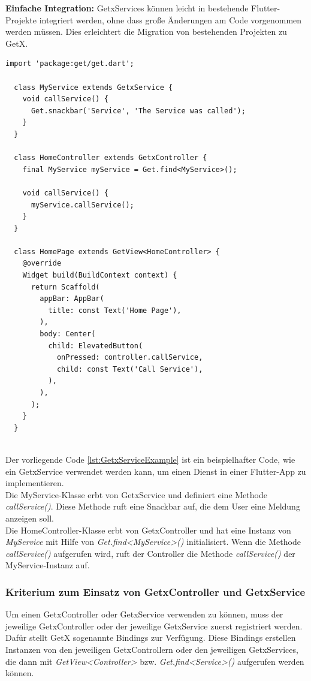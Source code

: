 \textbf{Einfache Integration:}
GetxServices können leicht in bestehende Flutter-Projekte integriert werden, ohne dass große Änderungen am Code vorgenommen werden müssen. Dies erleichtert die Migration von bestehenden Projekten zu GetX.
\\
\begin{lstlisting}[caption=Beispiel zum Einsatz von einem GetxService,label=lst:GetxServiceExample]
  import 'package:get/get.dart';

  class MyService extends GetxService {
    void callService() {
      Get.snackbar('Service', 'The Service was called');
    }
  }

  class HomeController extends GetxController {
    final MyService myService = Get.find<MyService>();
  
    void callService() {
      myService.callService();
    }
  }
  
  class HomePage extends GetView<HomeController> {
    @override
    Widget build(BuildContext context) {
      return Scaffold(
        appBar: AppBar(
          title: const Text('Home Page'),
        ),
        body: Center(
          child: ElevatedButton(
            onPressed: controller.callService,
            child: const Text('Call Service'),
          ),
        ),
      );
    }
  }
  
\end{lstlisting}
Der vorliegende Code \ref{lst:GetxServiceExample} ist ein beispielhafter Code, wie ein GetxService verwendet werden kann, um einen Dienst in einer Flutter-App zu implementieren.
\\
Die MyService-Klasse erbt von GetxService und definiert eine Methode \textit{callService()}. Diese Methode ruft eine Snackbar auf, die dem User eine Meldung anzeigen soll.
\\
Die HomeController-Klasse erbt von GetxController und hat eine Instanz von \textit{MyService} mit Hilfe von \textit{Get.find<MyService>()} initialisiert. Wenn die Methode \textit{callService()} aufgerufen wird, ruft der Controller die Methode \textit{callService()} der MyService-Instanz auf.

\subsubsection{Kriterium zum Einsatz von GetxController und GetxService}
Um einen GetxController oder GetxService verwenden zu können, muss der jeweilige GetxController oder der jeweilige GetxService zuerst registriert werden. Dafür stellt GetX sogenannte Bindings zur Verfügung. Diese Bindings erstellen Instanzen von den jeweiligen GetxControllern oder den jeweiligen GetxServices, die dann mit \textit{GetView<Controller>} bzw. \textit{Get.find<Service>()} aufgerufen werden können.


